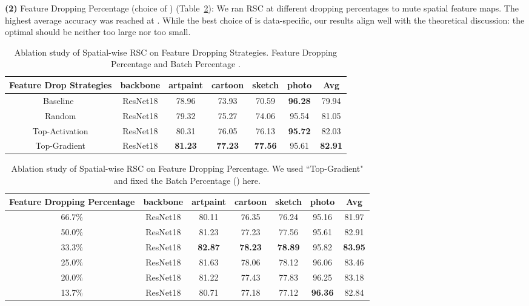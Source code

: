 \documentclass[runningheads]{llncs}
\begin{document}
\textbf{(2)} Feature Dropping Percentage (choice of ) (Table~\ref{table:Ablation2}): We ran RSC at different dropping percentages to mute spatial feature maps. The highest average accuracy was reached at . 
While the best choice of  is data-specific, our results align well with the theoretical discussion: the optimal  should be neither too large nor too small. 

\begin{table}[!htb]
\footnotesize
\centering \fontsize{7}{8}\selectfont
\begin{tabular}{c| c| c| c| c| c|| c } \hline Feature Drop Strategies & backbone & artpaint & cartoon & sketch & photo & Avg  \\ [0.5ex] \hline\hline Baseline~\cite{carlucci2019domain}& ResNet18  & 78.96 & 73.93  & 70.59 & \textbf{96.28} & 79.94 \\ Random & ResNet18  & 79.32 & 75.27 & 74.06 & 95.54 & 81.05\\
 Top-Activation& ResNet18  & 80.31 & 76.05 & 76.13 & \textbf{95.72}&  82.03\\ Top-Gradient& ResNet18  & \textbf{81.23} & \textbf{77.23} & \textbf{77.56} & 95.61& \textbf{82.91} \\ \hline 
\end{tabular}
\vspace{0.5em}
\caption{Ablation study of Spatial-wise RSC on Feature Dropping Strategies. Feature Dropping Percentage  and Batch Percentage .} \vspace{-.5em}
\label{table:Ablation1} \end{table}

\begin{table}[!htb]
\footnotesize
\centering \fontsize{7}{8}\selectfont
\begin{tabular}{c| c| c| c| c| c|| c } \hline Feature Dropping Percentage & backbone & artpaint & cartoon & sketch & photo & Avg  \\ [0.5ex] \hline\hline 66.7\%& ResNet18  & 80.11 & 76.35 & 76.24 & 95.16 & 81.97 \\
 50.0\%& ResNet18  & 81.23 & 77.23 & 77.56 & 95.61& 82.91 \\ 33.3\%& ResNet18  & \textbf{82.87} & \textbf{78.23} & \textbf{78.89} & 95.82& \textbf{83.95} \\
 25.0\%& ResNet18  & 81.63& 78.06 & 78.12&  96.06& 83.46 \\ 20.0\%& ResNet18  & 81.22& 77.43 &77.83 & 96.25 & 83.18 \\ 13.7\%& ResNet18  & 80.71& 77.18 & 77.12& \textbf{96.36} & 82.84 \\ \hline 
\end{tabular}
\vspace{0.5em}
\caption{Ablation study of Spatial-wise RSC on Feature Dropping Percentage. We used ``Top-Gradient" and fixed the Batch Percentage () here.} \vspace{-1em}
\label{table:Ablation2} \end{table}
\end{document}
